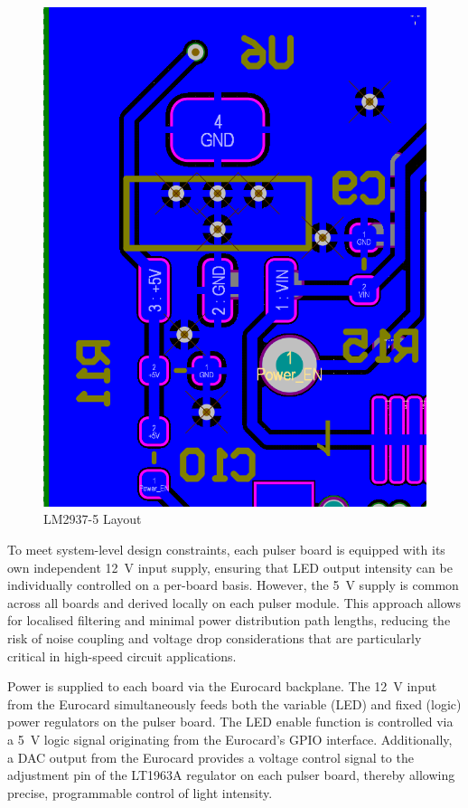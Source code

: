 \documentclass[a4paper,11pt]{article}
\begin{document}
\begin{figure}[htbp]
\centering
\includegraphics[scale=0.5]{LM29375Layout.png}
\caption{LM2937-5 Layout\label{fig:LM29375Layout}}
\end{figure}


To meet system-level design constraints, each pulser board is equipped with its own independent 12~V input supply, ensuring that LED output intensity can be individually controlled on a per-board basis. However, the 5~V supply is common across all boards and derived locally on each pulser module. This approach allows for localised filtering and minimal power distribution path lengths, reducing the risk of noise coupling and voltage drop considerations that are particularly critical in high-speed circuit applications.

Power is supplied to each board via the Eurocard backplane. The 12~V input from the Eurocard simultaneously feeds both the variable (LED) and fixed (logic) power regulators on the pulser board. The LED enable function is controlled via a 5~V logic signal originating from the Eurocard’s GPIO interface. Additionally, a DAC output from the Eurocard provides a voltage control signal to the adjustment pin of the LT1963A regulator on each pulser board, thereby allowing precise, programmable control of light intensity.
\end{document}
